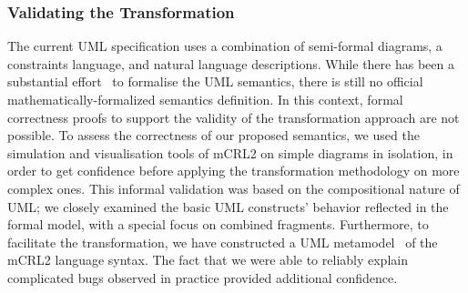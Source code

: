 \documentclass[letter]{llncs}
\newcommand{\secshrink}{\vspace{-.5cm}}
\newcommand{\subsecshrinkbegin}{\vspace{-.2cm}}
\begin{document}
\subsubsection{Validating the Transformation}
\subsecshrinkbegin
The current UML specification uses a combination of semi-formal diagrams, a constraints language, and natural language descriptions.
While there has been a substantial effort~\cite{Broy:2006:USS:1762828.1762881,lazuar2010tool,fUML,Diskin06mappings} to formalise the UML semantics, 
there is still no official mathematically-formalized semantics definition. 
In this context, formal correctness proofs to support the validity of the transformation approach are not possible.
To assess the correctness of our proposed semantics, we used the simulation and visualisation tools of mCRL2 on
simple diagrams in isolation, in order to get confidence before applying the transformation methodology on
more complex ones. This informal validation was based on the compositional nature of UML; we closely 
examined the basic UML constructs' behavior reflected in the formal model, with a special focus on combined fragments.
Furthermore, to facilitate the transformation, we have constructed a UML metamodel~\cite{repo:remenska} of the mCRL2 language syntax.
The fact that we were able to reliably explain complicated bugs observed in practice provided additional confidence.
%
% 
\secshrink
\end{document}
